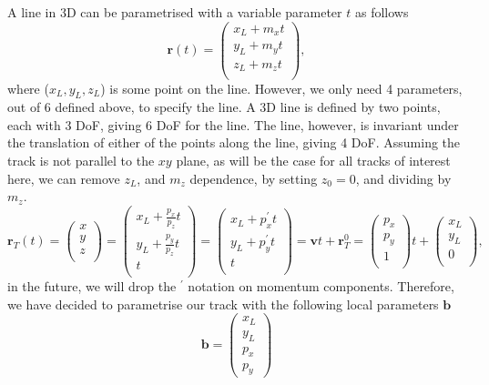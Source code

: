 \documentclass[a4paper,11pt]{article}
\begin{document}
A line in 3D can be parametrised with a variable parameter $t$ as follows
\begin{equation}
\textbf{r}(t) = \begin{pmatrix}x_L + m_x  t\\y_L + m_y t\\z_L + m_z t\\\end{pmatrix},
\end{equation}
where ($x_L, y_L, z_L$)  is some point on the line. However, we only need 4 parameters, out of 6 defined above, to specify the line. A 3D line is defined by two points, each with 3 DoF, giving 6 DoF for the line. The line, however, is invariant under the translation of either of the points along the line, giving 4 DoF. Assuming the track is not parallel to the $xy$ plane, as will be the case for all tracks of interest here, we can remove $z_L$, and $m_z$ dependence, by setting $z_0=0$, and dividing by $m_z$. 
\begin{equation}
\textbf{r}_T(t) = \begin{pmatrix}x\\y\\z\\\end{pmatrix} = \begin{pmatrix}x_L + \frac{p_x}{p_z}  t\\y_L + \frac{p_y}{p_z}  t\\  t\\\end{pmatrix} = \begin{pmatrix}x_L + p_x^{'} t\\y_L + p_y^{'}  t\\  t\\\end{pmatrix}= \textbf{v}t+\textbf{r}_T^0=\begin{pmatrix}p_x\\ p_y \\  1\\\end{pmatrix}t + \begin{pmatrix}x_L \\y_L  \\  0\\\end{pmatrix},
\label{eq:track}
\end{equation}
in the future, we will drop the $^{'}$ notation on momentum components. Therefore, we have decided to
parametrise our track with the following local parameters $\textbf{b}$
\begin{equation}
\textbf{b} = \begin{pmatrix}x_L \\y_L \\p_x \\ p_y\end{pmatrix}
\end{equation}
\end{document}
